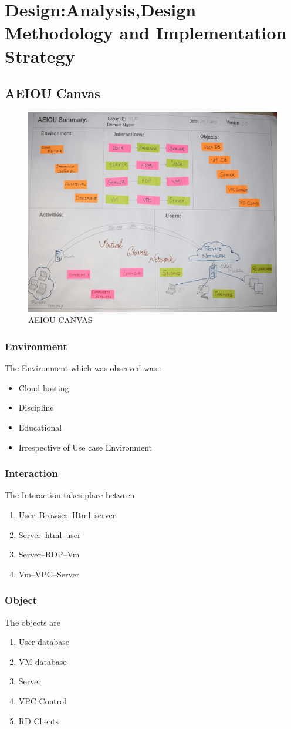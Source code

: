 \documentclass[12pt,a4paper,final,oneside]{report}
\begin{document}
\chapter{Design:Analysis,Design Methodology and Implementation Strategy}	
	\raggedright \section{AEIOU Canvas} 
	\textbf{}
	\noindent\begin{figure}[h]
		\centering
		\includegraphics[width=0.685\linewidth,angle=0]{aeiou.jpg}
		\caption{AEIOU CANVAS }
	\end{figure}
	\subsection{Environment}
\textbf{}
 \flushleft The Environment which was observed was :
\begin{itemize}
\item Cloud hosting
\item Discipline 
\item Educational
\item Irrespective of Use case Environment 
\end{itemize}	
\subsection{Interaction}
\textbf{}
The Interaction takes place between 
\begin{enumerate}
\item User--Browser--Html--server
\item Server--html--user
\item Server--RDP--Vm
\item Vm--VPC--Server
\end{enumerate} 
\subsection{Object}
\textbf{}
The objects are 
\begin{enumerate}
\item User database
\item VM database
\item Server
\item VPC Control
\item RD Clients
\end{enumerate} 
\end{document}
